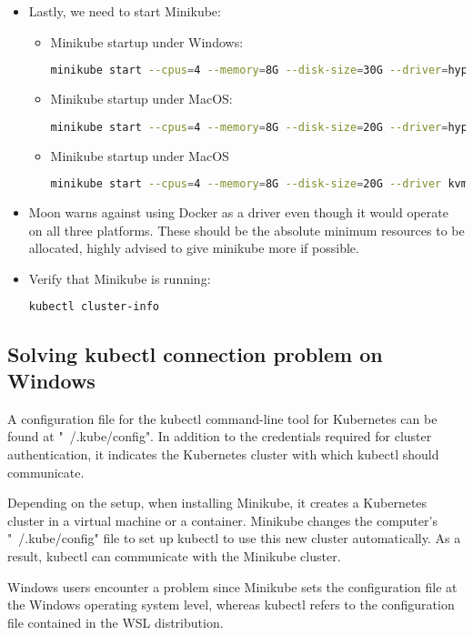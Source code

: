 \begin{itemize}
	\item Lastly, we need to start Minikube:
	\begin{itemize}
		\item Minikube startup under Windows:
		\begin{lstlisting}[language=bash]
			minikube start --cpus=4 --memory=8G --disk-size=30G --driver=hyperv
		\end{lstlisting}
		\item Minikube startup under MacOS:
		\begin{lstlisting}[language=bash]
			minikube start --cpus=4 --memory=8G --disk-size=20G --driver=hyperkit
		\end{lstlisting}
		\item Minikube startup under MacOS
		\begin{lstlisting}[language=bash]
			minikube start --cpus=4 --memory=8G --disk-size=20G --driver kvm2
		\end{lstlisting}
	\end{itemize}
	\item Moon warns against using Docker as a driver even though it would operate on all three platforms. These should be the absolute minimum resources to be allocated, highly advised to give minikube more if possible.
	\item Verify that Minikube is running:
	\begin{lstlisting}[language=bash]
		kubectl cluster-info
	\end{lstlisting}
\end{itemize}

\subsection{Solving kubectl connection problem on Windows}

A configuration file for the kubectl command-line tool for Kubernetes can be found at "~/.kube/config". In addition to the credentials required for cluster authentication, it indicates the Kubernetes cluster with which kubectl should communicate.

Depending on the setup, when installing Minikube, it creates a Kubernetes cluster in a virtual machine or a container. Minikube changes the computer's "~/.kube/config" file to set up kubectl to use this new cluster automatically. As a result, kubectl can communicate with the Minikube cluster.

Windows users encounter a problem since Minikube sets the configuration file at the Windows operating system level, whereas kubectl refers to the configuration file contained in the WSL distribution.

